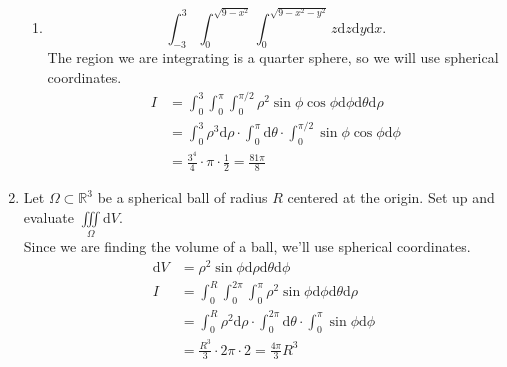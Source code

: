 \begin{enumerate}
\begin{enumerate}[label=\alph*.]
		\item \begin{equation*}
			\int_{-3}^{3}{\int_{0}^{\sqrt{9 - x^2}}{\int_{0}^{\sqrt{9 - x^2 - y^2}}{z\mathrm{d}z}\mathrm{d}y}\mathrm{d}x}.
		\end{equation*}
		The region we are integrating is a quarter sphere, so we will use spherical coordinates.
		\begin{align*}
			I &= \int_{0}^{3}{\int_{0}^{\pi}{\int_{0}^{\pi/2}{\rho^2\sin{\phi}\cos{\phi}\mathrm{d}\phi}\mathrm{d}\theta}\mathrm{d}\rho} \\
			&= \int_{0}^{3}{\rho^3\mathrm{d}\rho}\cdot\int_{0}^{\pi}{\mathrm{d}\theta} \cdot \int_{0}^{\pi/2}{\sin{\phi}\cos{\phi}\mathrm{d}\phi} \\
			&= \frac{3^4}{4} \cdot \pi \cdot \frac{1}{2} = \frac{81\pi}{8}
		\end{align*}
	\end{enumerate}
	
	\item Let $\Omega \subset \mathbb{R}^3$ be a spherical ball of radius $R$ centered at the origin. Set up and evaluate $\iiint\limits_{\Omega}{\mathrm{d}V}$.\\
	Since we are finding the volume of a ball, we'll use spherical coordinates.
	\begin{align*}
		\mathrm{d}V &= \rho^2\sin{\phi}\mathrm{d}\rho\mathrm{d}\theta\mathrm{d}\phi \\
		I &= \int_{0}^{R}{\int_{0}^{2\pi}{\int_{0}^{\pi}{\rho^2\sin{\phi}\mathrm{d}\phi}\mathrm{d}\theta}\mathrm{d}\rho} \\
		&= \int_{0}^{R}{\rho^2\mathrm{d}\rho} \cdot \int_{0}^{2\pi}{\mathrm{d}\theta} \cdot \int_{0}^{\pi}{\sin{\phi}\mathrm{d}\phi} \\
		&= \frac{R^3}{3} \cdot 2\pi \cdot 2 = \frac{4\pi}{3}R^3
	\end{align*}
	

\end{enumerate}
